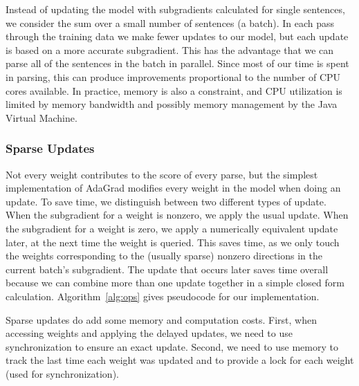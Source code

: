 Instead of updating the model with subgradients calculated for single sentences, we consider the sum over a small number of sentences (a batch).
In each pass through the training data we make fewer updates to our model, but each update is based on a more accurate subgradient.
This has the advantage that we can parse all of the sentences in the batch in parallel.
Since most of our time is spent in parsing, this can produce improvements proportional to the number of CPU cores available.
In practice, memory is also a constraint, and CPU utilization is limited by memory bandwidth and possibly memory management by the Java Virtual Machine.

\subsubsection{Sparse Updates}

Not every weight contributes to the score of every parse, but the simplest implementation of AdaGrad modifies every weight in the model when doing an update.
To save time, we distinguish between two different types of update.
When the subgradient for a weight is nonzero, we apply the usual update.
When the subgradient for a weight is zero, we apply a numerically equivalent update later, at the next time the weight is queried.
This saves time, as we only touch the weights corresponding to the (usually sparse) nonzero directions in the current batch's subgradient.
The update that occurs later saves time overall because we can combine more than one update together in a simple closed form calculation.
Algorithm~\ref{alg:ops} gives pseudocode for our implementation.

Sparse updates do add some memory and computation costs.
First, when accessing weights and applying the delayed updates, we need to use synchronization to ensure an exact update.
Second, we need to use memory to track the last time each weight was updated and to provide a lock for each weight (used for synchronization).

